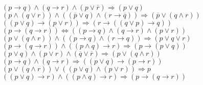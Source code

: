 \documentclass{article}
\begin{document}
\begin{titlingpage}
$(p\rightarrow q)\wedge(q\rightarrow r)\wedge(p\vee \overline{r})\Rightarrow(p\vee q)$ \\
$(p\wedge(q\vee r))\wedge((\overline{p}\vee q)\wedge(r\rightarrow\overline{q}))\Rightarrow(\overline{p}\vee(q\wedge r))$ \\
$((p\vee q)\rightarrow(p\vee r))\Rightarrow(r\rightarrow((q\vee p)\rightarrow q))$ \\
$(p\rightarrow(q\rightarrow r))\Leftrightarrow((p\rightarrow q)\wedge(q\rightarrow r)\wedge(p\vee r))$ \\
$(p\vee(q\wedge r))\wedge((p\rightarrow q)\wedge (r\rightarrow q))\Rightarrow(p\vee q\vee r)$ \\
$(p\rightarrow(q\rightarrow r))\wedge((p\wedge q)\rightarrow r)\Rightarrow(p\rightarrow(p\vee q))$ \\
$(p\vee q)\wedge(p\vee r)\wedge(\overline{q}\vee \overline{r})\Rightarrow(p\vee(q\wedge r))$ \\
$(p\rightarrow q)\wedge(q\rightarrow r)\Rightarrow ((p\vee q)\rightarrow(p\rightarrow r))$ \\
$(p\vee(q\wedge r))\vee((p\vee q)\wedge(p\vee r))\Rightarrow p$ \\
$((p\vee q)\rightarrow r)\wedge((p\wedge q)\rightarrow r) \Rightarrow (p\rightarrow(q\rightarrow r))$ \\

\end{titlingpage}
\end{document}
